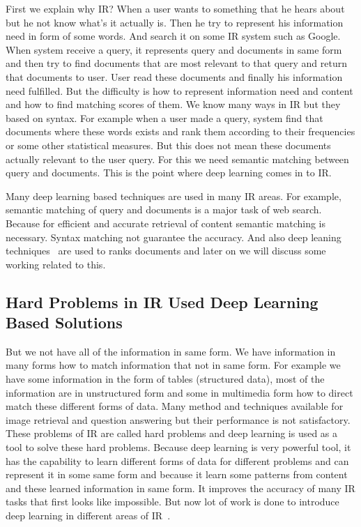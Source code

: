 \documentclass{doublecol-new}
\theoremstyle{TH}{
\newtheorem{lemma}{Lemma}
\newtheorem{theorem}[lemma]{Theorem}
\newtheorem{corrolary}[lemma]{Corrolary}
\newtheorem{conjecture}[lemma]{Conjecture}
\newtheorem{proposition}[lemma]{Proposition}
\newtheorem{claim}[lemma]{Claim}
\newtheorem{stheorem}[lemma]{Wrong Theorem}
\newtheorem{algorithm}{Algorithm}
}
\theoremstyle{THrm}{
\newtheorem{definition}{Definition}[section]
\newtheorem{question}{Question}[section]
\newtheorem{remark}{Remark}
\newtheorem{scheme}{Scheme}
}
\theoremstyle{THhit}{
\newtheorem{case}{Case}[section]
}
\begin{document}
First we explain why IR? When a user wants to something that he hears about but he not know what’s it actually is. Then he try to represent his information need in form of some words. And search it on some IR system such as Google. When system receive a query, it represents query and documents in same form and then try to find documents that are most relevant to that query and return that documents to user. User read these documents and finally his information need fulfilled. But the difficulty is how to represent information need and content and how to find matching scores of them. We know many ways in IR but they based on syntax. For example when a user made a query, system find that documents where these words exists and rank them according to their frequencies or some other statistical measures. But this does not mean these documents actually relevant to the user query. For this we need semantic matching between query and documents. This is the point where deep learning comes in to IR. 

Many deep learning based techniques are used in many IR areas. For example, semantic matching of query and documents is a major task of web search. Because for efficient and accurate retrieval of content semantic matching is necessary. Syntax matching not guarantee the accuracy. And also deep leaning techniques~\cite{mitra2017neural} are used to ranks documents and later on we will discuss some working related to this.  

\subsection{Hard Problems in IR Used Deep Learning Based Solutions}

But we not have all of the information in same form. We have information in many forms how to match information that not in same form. For example we have some information in the form of tables (structured data), most of the information are in unstructured form and some in multimedia form how to direct match these different forms of data. Many method and techniques available for image retrieval and question answering but their performance is not satisfactory. These problems of IR are called hard problems and deep learning is used as a tool to solve these hard problems. Because deep learning is very powerful tool, it has the capability to learn different forms of data for different problems and can represent it in some same form and because it learn some patterns from content and these learned information in same form. It improves the accuracy of many IR tasks that first looks like impossible. But now lot of work is done to introduce deep learning in different areas of IR~\cite{pang2016text}. 
\end{document}
